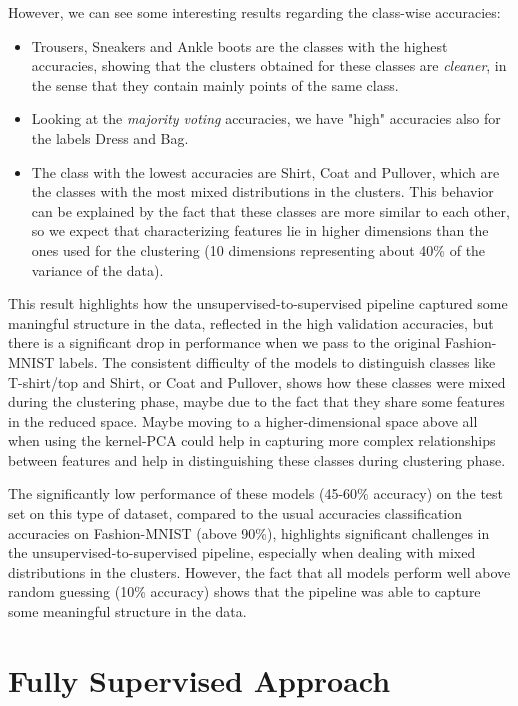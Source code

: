 \documentclass[a4paper, 10pt]{article}
\begin{document}
However, we can see some interesting results regarding the class-wise accuracies: 
\begin{itemize}
    \item Trousers, Sneakers and Ankle boots are the classes with the highest accuracies, showing that the clusters obtained for these classes are \textit{cleaner},
    in the sense that they contain mainly points of the same class.
    \item Looking at the \textit{majority voting} accuracies, we have "high" accuracies also for the labels Dress and Bag.
    \item The class with the lowest accuracies are Shirt, Coat and Pullover, which are the classes with the most mixed distributions in the clusters. This behavior can be 
    explained by the fact that these classes are more similar to each other, so we expect that characterizing features lie in higher dimensions than the ones
    used for the clustering (10 dimensions representing about 40\% of the variance of the data).
\end{itemize}

This result highlights how the unsupervised-to-supervised pipeline captured some maningful structure in the data, reflected in the high validation accuracies, 
but there is a significant drop in performance when we pass to the original Fashion-MNIST labels. The consistent difficulty of the models to distinguish classes like
T-shirt/top and Shirt, or Coat and Pullover, shows how these classes were mixed during the clustering phase, maybe due to the fact that they share some features
in the reduced space. Maybe moving to a higher-dimensional space above all when using the kernel-PCA could help in capturing more complex relationships between
features and help in distinguishing these classes during clustering phase.

The significantly low performance of these models (45-60\% accuracy) on the test set on this type of dataset, compared to the usual accuracies classification 
accuracies on Fashion-MNIST (above 90\%), highlights significant challenges in the unsupervised-to-supervised pipeline, especially when dealing with mixed 
distributions in the clusters. However, the fact that all models perform well above random guessing (10\% accuracy) shows that the pipeline was able to capture
some meaningful structure in the data.

\section{Fully Supervised Approach}
\end{document}
